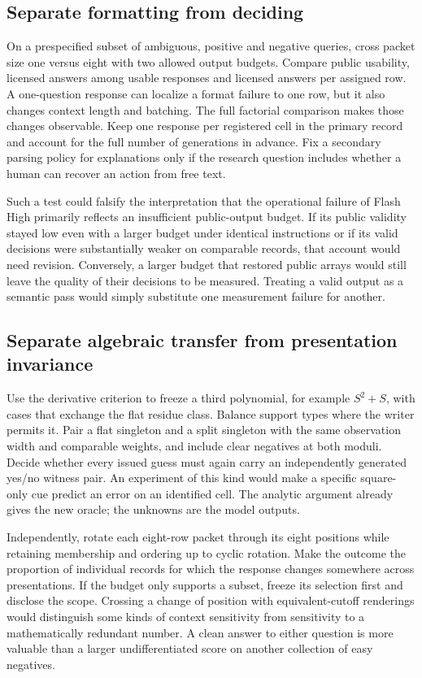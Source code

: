 \documentclass[12pt,letterpaper]{article}
\begin{document}
\subsection{Separate formatting from deciding}
On a prespecified subset of ambiguous, positive and negative queries, cross packet size one versus eight with two allowed output budgets. Compare public usability, licensed answers among usable responses and licensed answers per assigned row. A one-question response can localize a format failure to one row, but it also changes context length and batching. The full factorial comparison makes those changes observable. Keep one response per registered cell in the primary record and account for the full number of generations in advance. Fix a secondary parsing policy for explanations only if the research question includes whether a human can recover an action from free text.

Such a test could falsify the interpretation that the operational failure of Flash High primarily reflects an insufficient public-output budget. If its public validity stayed low even with a larger budget under identical instructions or if its valid decisions were substantially weaker on comparable records, that account would need revision. Conversely, a larger budget that restored public arrays would still leave the quality of their decisions to be measured. Treating a valid output as a semantic pass would simply substitute one measurement failure for another.

\subsection{Separate algebraic transfer from presentation invariance}
Use the derivative criterion to freeze a third polynomial, for example $S^2+S$, with cases that exchange the flat residue class. Balance support types where the writer permits it. Pair a flat singleton and a split singleton with the same observation width and comparable weights, and include clear negatives at both moduli. Decide whether every issued guess must again carry an independently generated yes/no witness pair. An experiment of this kind would make a specific square-only cue predict an error on an identified cell. The analytic argument already gives the new oracle; the unknowns are the model outputs.

Independently, rotate each eight-row packet through its eight positions while retaining membership and ordering up to cyclic rotation. Make the outcome the proportion of individual records for which the response changes somewhere across presentations. If the budget only supports a subset, freeze its selection first and disclose the scope. Crossing a change of position with equivalent-cutoff renderings would distinguish some kinds of context sensitivity from sensitivity to a mathematically redundant number. A clean answer to either question is more valuable than a larger undifferentiated score on another collection of easy negatives.
\end{document}
